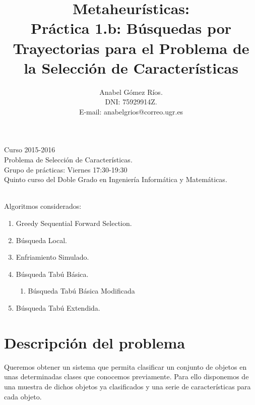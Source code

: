 \documentclass[12pt]{article}
\title{Metaheur\'isticas:\\
 Pr\'actica 1.b: B\'usquedas por Trayectorias para el Problema de la Selecci\'on de Caracter\'isticas}
\author{Anabel G\'omez R\'ios.\\
 DNI: 75929914Z.\\
 E-mail: anabelgrios@correo.ugr.es}
\begin{document}
\maketitle

\begin{center}
Curso 2015-2016\\

Problema de Selección de Características.\\ 

Grupo de prácticas: Viernes 17:30-19:30\\

Quinto curso del Doble Grado en Ingeniería Informática y Matemáticas.\\
\textit{ }\\
\end{center}

Algoritmos considerados:
\begin{enumerate}
\item Greedy Sequential Forward Selection.
\item Búsqueda Local.
\item Enfriamiento Simulado.
\item Búsqueda Tabú Básica.
\begin{enumerate}
\item Búsqueda Tabú Básica Modificada
\end{enumerate}
\item Búsqueda Tabú Extendida.
\end{enumerate}

\newpage

\tableofcontents

\newpage

\section{Descripción del problema}
Queremos obtener un sistema que permita clasificar un conjunto de objetos en unas determinadas clases que conocemos previamente. Para ello disponemos de una muestra de dichos objetos ya clasificados y una serie de características para cada objeto.\\
\end{document}
